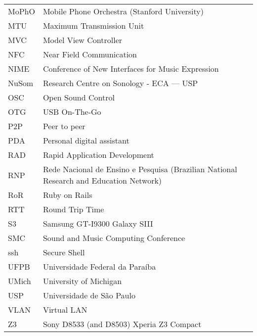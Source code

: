 \documentclass[11pt,twoside,a4paper]{book}
\begin{document}
\begin{longtable}{ll}
		MoPhO		& Mobile Phone Orchestra (Stanford University)\\
		MTU			& Maximum Transmission Unit\\
		MVC         & Model View Controller\\
		NFC         & Near Field Communication\\
		NIME		& Conference of New Interfaces for Music Expression\\
		NuSom		& Research Centre on Sonology - ECA --- USP\\
		OSC		    & Open Sound Control\\
		OTG         & USB On-The-Go\\
		P2P         & Peer to peer\\
		PDA		    & Personal digital assistant\\
		RAD		    & Rapid Application Development\\
		RNP		    & Rede Nacional de Ensino e Pesquisa (Brazilian National Research and Education Network)\\
		RoR		    & Ruby on Rails\\
		RTT		    & Round Trip Time\\
		S3		    & Samsung GT-I9300 Galaxy SIII\\
		SMC		    & Sound and Music Computing Conference\\
		ssh		    & Secure Shell\\
		UFPB	    & Universidade Federal da Paraíba\\
		UMich	    & University of Michigan\\
		USP         & Universidade de São Paulo\\
		VLAN        & Virtual LAN\\
		Z3		    & Sony D8533 (and D8503) Xperia Z3 Compact\\
		
		
	\end{longtable}
	\printnomenclature
	
	
	
\end{document}
